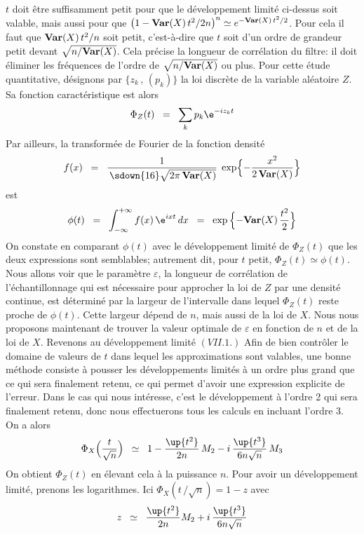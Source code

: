 $t$ doit \^etre suffisamment petit pour que le d\'eveloppement limit\'e
ci-dessus soit valable, mais aussi pour que $\bigl( 1 -  {\bf Var}  (X)\, t^2
/ 2n\bigr)^n \simeq e^{-{\bf Var} (X)\, {t^2/ 2}}$. Pour cela il faut que 
${\bf Var} (X)\, t^2 / n$ soit petit, c'est-\`a-dire que $t$ soit d'un ordre 
de grandeur petit devant $\sqrt{n / {\bf Var} (X)}$. Cela pr\'ecise la
longueur de corr\'elation du filtre: il doit \'eliminer les  fr\'equences de
l'ordre de $\sqrt{n / {\bf Var} (X)}$ ou plus.  Pour cette \'etude quantitative,
d\'esignons par $\{ z_k\, ,\, (p_k)\}$ la loi discr\`ete de la variable 
al\'eatoire $Z$. Sa fonction caract\'eristique est alors
$$\Phi_Z(t) \;\; = \;\; \sum_k p_k \e^{-iz_kt}$$
Par ailleurs, la transform\'ee de Fourier de la fonction densit\'e
$$f(x) \;\; = \;\; {1\over\,\sdown{16} \sqrt{2\pi\, {\bf Var}(X)}}\; 
\exp \Bigl\{ - {x^2 \over
2\, {\bf Var}(X)} \Bigr\}$$  
est
$$\phi (t) \;\; = \;\; \int_{-\infty}^{+\infty} f(x)\, \e^{ixt}\, dx \;\; 
=
\;\; \exp\, \Bigl\{ - {\bf Var}(X)\, {t^2\over 2}\Bigr\}$$ 
On constate en comparant $\phi (t)$ avec le d\'eveloppement limit\'e de
$\Phi_Z(t)$ que les deux expressions sont semblables; autrement dit, 
pour $t$ petit, $\Phi_Z(t) \simeq \phi (t)$.
\medskip
Nous allons voir que le param\`etre $\varepsilon$,  la longueur de
corr\'elation de l'\'echantillonnage qui est n\'ecessaire pour approcher 
la loi de $Z$ par une densit\'e continue,  est d\'etermin\'e par la largeur
de l'intervalle dans lequel $\Phi_Z(t)$ reste proche de $\phi (t)$.  Cette
largeur d\'epend de $n$, mais aussi de la loi de $X$.  Nous nous
proposons maintenant de trouver la valeur optimale de $\varepsilon$ 
en fonction de $n$ et de la loi de $X$.
\medskip
Revenons au d\'eveloppement limit\'e $(VII.1.)$ Afin de bien contr\^oler 
le  domaine de valeurs de $t$ dans lequel les approximations sont
valables, une bonne m\'ethode consiste \`a pousser les d\'eveloppements
limit\'es \`a un ordre plus grand que ce qui sera finalement retenu, ce 
qui permet d'avoir une expression explicite de l'erreur. Dans le cas qui
nous int\'eresse, c'est le d\'eveloppement \`a l'ordre 2 qui sera 
finalement retenu, donc nous effectuerons tous les calculs en incluant
l'ordre 3.  On a alors 
$$\Phi_X \Bigl( {t\over\sqrt{n}}\Bigr) \;\; \simeq \;\; 1 - {\up{t^2}
\over 2n}\,
M_2 - i\, {\up{t^3} \over 6n\sqrt{n}}\, M_3$$
On obtient $\Phi_Z (t)$ en \'elevant cela \`a la puissance $n$. Pour avoir
un d\'evelop\-pe\-ment limit\'e, prenons les logarithmes. Ici
$\Phi_X ( t\, /\sqrt{n}) = 1 - z$ avec 
$$z \;\; \simeq \;\; {\up{t^2} \over 2n} M_2 + i \,{\up{t^3}
\over 6n\sqrt{n}}$$
